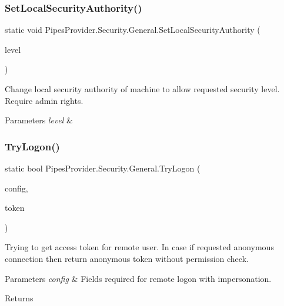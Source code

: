 \subsubsection{\texorpdfstring{Set\+Local\+Security\+Authority()}{SetLocalSecurityAuthority()}}
{\footnotesize\ttfamily static void Pipes\+Provider.\+Security.\+General.\+Set\+Local\+Security\+Authority (\begin{DoxyParamCaption}\item[{\mbox{\hyperlink{namespace_pipes_provider_1_1_security_a1a6020eca1c661a6f7140e8260502d7e}{Security\+Level}}}]{level }\end{DoxyParamCaption})\hspace{0.3cm}{\ttfamily [static]}}



Change local security authority of machine to allow requested security level. Require admin rights. 


\begin{DoxyParams}{Parameters}
{\em level} & \\
\hline
\end{DoxyParams}
\mbox{\label{class_pipes_provider_1_1_security_1_1_general_ab72cbd58c62e331b7602c6f99ad7cf54}} 
\subsubsection{\texorpdfstring{Try\+Logon()}{TryLogon()}}
{\footnotesize\ttfamily static bool Pipes\+Provider.\+Security.\+General.\+Try\+Logon (\begin{DoxyParamCaption}\item[{\mbox{\hyperlink{struct_pipes_provider_1_1_security_1_1_logon_config}{Logon\+Config}}}]{config,  }\item[{out Safe\+Access\+Token\+Handle}]{token }\end{DoxyParamCaption})\hspace{0.3cm}{\ttfamily [static]}}



Trying to get access token for remote user. In case if requested anonymous connection then return anonymous token without permission check. 


\begin{DoxyParams}{Parameters}
{\em config} & Fields required for remote logon with impersonation.\\
\hline
\end{DoxyParams}
\begin{DoxyReturn}{Returns}

\end{DoxyReturn}


